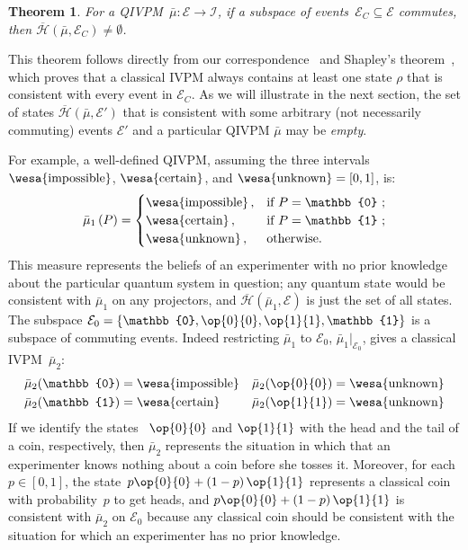 \documentclass[english,reprint, aps, prl,superscriptaddress, showpacs,
showkeys, longbibliography, amsmath, amssymb]{revtex4-1}
\theoremstyle{plain}
\newtheorem{thm}{Theorem}
\theoremstyle{definition}
\newcommand{\Hilb}{\mathcal{H}}
\newcommand{\events}{\ensuremath{\mathcal{E}}}
\newcommand{\imposs}{{\text{\wesa{impossible}}}}
\newcommand{\necess}{{\text{\wesa{certain}}}}
\newcommand{\unknown}{{\text{\wesa{unknown}}}}
\newcommand{\proj}[1]{\op{#1}{#1}}
\newcommand{\coreBorn}{\ensuremath{\overline{\Hilb}}}
\begin{document}
\begin{thm}\label{thm:Shapley}
  For a QIVPM~$\bar{\mu}:\events\rightarrow\mathscr{I}$, if a subspace
  of events~$\events_C\subseteq\events$ commutes, then
  $\coreBorn\left(\bar{\mu},\events_C\right)\ne\emptyset$.
\end{thm}

This theorem follows directly from our
correspondence~\cite{HOSTunpublished} and Shapley's
theorem~\cite{Shapley1971,GilboaSchmeidler1994,Grabisch2016}, which
proves that a classical IVPM always contains at least one state $\rho$
that is consistent with every event in $\events_C$. As we will
illustrate in the next section, the set of states
$\coreBorn\left(\bar{\mu},\events'\right)$ that is consistent with
some arbitrary (not necessarily commuting) events $\events'$ and a
particular QIVPM $\bar{\mu}$ may be \emph{empty}.

For example, a well-defined  
QIVPM, assuming the three intervals $\imposs$, $\necess$, and
$\unknown=\left[0,1\right]$, is:
\begin{equation}
\bar{\mu}_{1}\left(P\right)=\begin{cases}
\imposs\,, & \text{if }P=\mathbb{0}\text{ ;}\\
\necess\,, & \text{if }P=\mathbb{1}\text{ ;}\\
\unknown\,, & \text{otherwise.}
\end{cases}\label{eq:no-information-IVPM}
\end{equation}
This measure represents the beliefs of an experimenter with no prior
knowledge about the particular quantum system in question; any quantum
state would be consistent with $\bar{\mu}_{1}$ on any projectors, and
$\coreBorn\left(\bar{\mu}_{1},\events\right)$ is just the set of all
states. The subspace
$\events_{0}=\left\{ \mathbb{0},\proj{0},\proj{1},\mathbb{1}\right\} $
is a subspace of commuting events. Indeed restricting $\bar{\mu}_{1}$
to $\events_{0}$, $\bar{\mu}_{1}|_{\events_{0}}$, gives a classical
IVPM~$\bar{\mu}_{2}$:
\begin{equation}
\begin{aligned}\bar{\mu}_{2}(\mathbb{0}) & =\imposs & \bar{\mu}_{2}(\proj{0}) & =\unknown\\
\bar{\mu}_{2}(\mathbb{1}) & =\necess & \bar{\mu}_{2}(\proj{1}) & =\unknown
\end{aligned}
\end{equation}
If we identify the states ~$\proj{0}$ and $\proj{1}$ with the head
and the tail of a coin, respectively, then $\bar{\mu}_{2}$ represents
the situation in which that an experimenter knows nothing about a coin
before she tosses it. Moreover, for each $p\in\left[0,1\right]$, the
state~$p\proj{0}+\left(1-p\right)\proj{1}$ represents a classical
coin with probability~$p$ to get heads, and
$p\proj{0}+\left(1-p\right)\proj{1}$ is consistent with
$\bar{\mu}_{2}$ on $\events_{0}$ because any classical coin should be
consistent with the situation for which an experimenter has no prior
knowledge.
\end{document}
